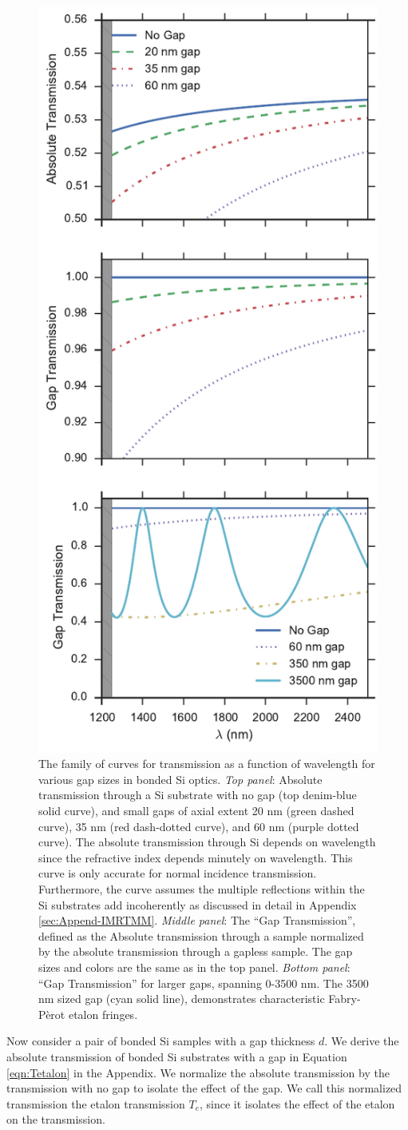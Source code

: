\documentclass[osajnl,preprint,showpacs,superscriptaddress,12pt]{revtex4-1} %
\begin{document}
\begin{figure}[htbp]
\centerline{\includegraphics[width=0.40\columnwidth]{figs/etalon_trans.pdf}}
\caption{\label{figAbsoluteTrans}The family of curves for transmission as a function of wavelength for various gap sizes in bonded Si optics.  \emph{Top panel}: Absolute transmission through a Si substrate with no gap (top denim-blue solid curve), and small gaps of axial extent 20 nm (green dashed curve), 35 nm (red dash-dotted curve), and 60 nm (purple dotted curve).  The absolute transmission through Si depends on wavelength since the refractive index depends minutely on wavelength.  This curve is only accurate for normal incidence transmission.  Furthermore, the curve assumes the multiple reflections within the Si substrates add incoherently as discussed in detail in Appendix \ref{sec:Append-IMRTMM}.  \emph{Middle panel}: The ``Gap Transmission'', defined as the Absolute transmission through a sample normalized by the absolute transmission through a gapless sample. The gap sizes and colors are the same as in the top panel.  \emph{Bottom panel}: ``Gap Transmission'' for larger gaps, spanning 0-3500 nm.  The 3500 nm sized gap (cyan solid line), demonstrates characteristic Fabry-P\`erot etalon fringes.}
\end{figure}

Now consider a pair of bonded Si samples with a gap thickness $d$. We derive the absolute transmission of bonded Si substrates with a gap in Equation \ref{eqn:Tetalon} in the Appendix.  We normalize the absolute transmission by the transmission with no gap to isolate the effect of the gap.  We call this normalized transmission the etalon transmission $T_{e}$, since it isolates the effect of the etalon on the transmission.
\end{document}
